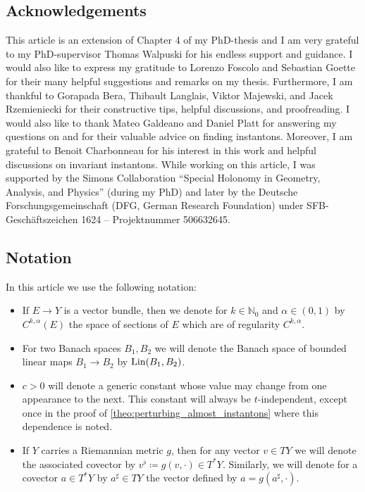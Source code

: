 \documentclass[11pt,a4paper]{scrartcl}
\numberwithin{equation}{section}
\theoremstyle{plain}
\theoremstyle{definition}
\theoremstyle{remark}
\begin{document}
\subsection{Acknowledgements}

This article is an extension of Chapter 4 of my PhD-thesis \cite{Gutwein-Diss} and I am very grateful to my PhD-supervisor Thomas Walpuski for his endless support and guidance. I would also like to express my gratitude to Lorenzo Foscolo and Sebastian Goette for their many helpful suggestions and remarks on my thesis. Furthermore, I am thankful to Gorapada Bera, Thibault Langlais, Viktor Majewski, and Jacek Rzemieniecki for their constructive tips, helpful discussions, and proofreading. I would also like to thank Mateo Galdeano and Daniel Platt for answering my questions on \cite{GaldeanoPlattTanakaWang-spin7instantons} and for their valuable advice on finding instantons. Moreover, I am grateful to Benoit Charbonneau for his interest in this work and helpful discussions on invariant instantons. While working on this article, I was supported by the Simons Collaboration “Special Holonomy in Geometry, Analysis, and Physics” (during my PhD) and later by the Deutsche Forschungsgemeinschaft (DFG, German Research Foundation) under SFB-Geschäftszeichen 1624 – Projektnummer 506632645. 

\subsection{Notation}

In this article we use the following notation: 
\begin{itemize}
\item If $E\to Y$ is a vector bundle, then we denote for $k\in \mathbb{N}_0$ and $\alpha \in (0,1)$ by $C^{k,\alpha}(E)$ the space of sections of $E$ which are of regularity $C^{k,\alpha}$.
\item For two Banach spaces $B_1,B_2$ we will denote the Banach space of bounded linear maps $B_1 \to B_2$ by $\textup{Lin}(B_1,B_2)$.
\item $c>0$ will denote a generic constant whose value may change from one appearance to the next. This constant will always be $t$-independent, except once in the proof of \autoref{theo:perturbing_almost_instantons} where this dependence is noted.
\item If $Y$ carries a Riemannian metric $g$, then for any vector $v \in TY$ we will denote the associated covector by $v^\flat \coloneqq g(v,\cdot) \in T^*Y$. Similarly, we will denote for a covector $a \in T^*Y$ by $a^\sharp \in TY$ the vector defined by $a = g(a^\sharp,\cdot)$.
\end{itemize}
\end{document}

